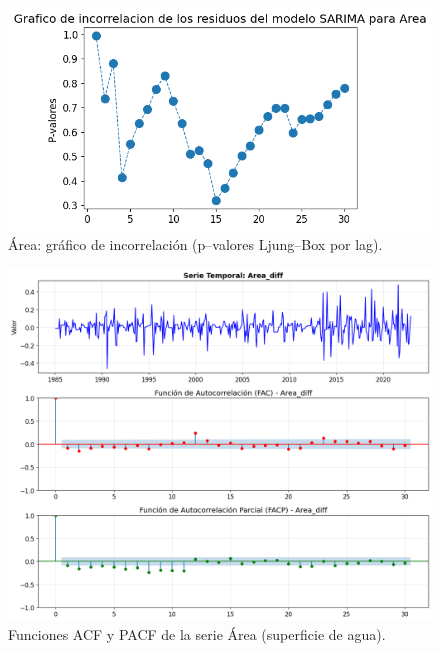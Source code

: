 \begin{figure}[H]\centering
\includegraphics[scale=.52]{Figures/inco_area.png}
\caption{Área: gráfico de incorrelación (p--valores Ljung--Box por lag).}
\label{fig:inco_area}
\end{figure}

\begin{figure}[H]
    \centering
    \includegraphics[scale=.42]{Figures/facp_Area_dif.png}
    \caption{Funciones ACF y PACF de la serie Área (superficie de agua).}
    \label{fig:facp_area_dif}
\end{figure}

